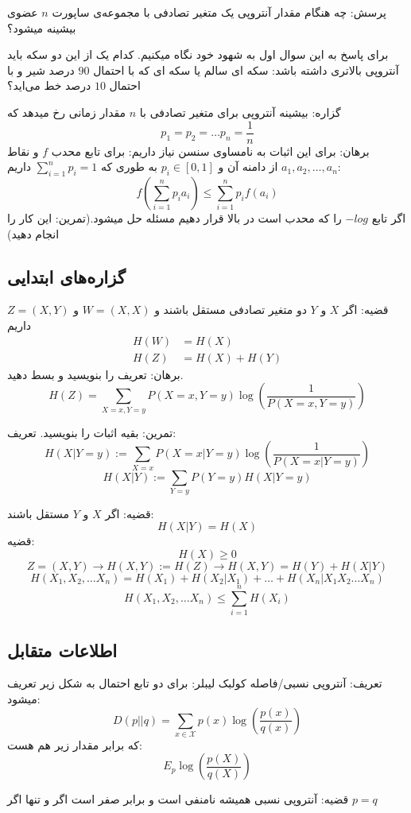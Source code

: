 پرسش: چه هنگام مقدار آنتروپی یک متغیر تصادفی با مجموعه‌ی ساپورت
$n$
عضوی بیشینه میشود؟

برای پاسخ به این سوال اول به شهود خود نگاه میکنیم. کدام یک از این دو سکه باید آنتروپی بالاتری داشته باشد: سکه ای سالم یا سکه ای که با احتمال
$90$
درصد شیر و با احتمال
$10$
درصد خط می‌اید؟

گزاره: بیشینه آنتروپی برای متغیر تصادفی با
$n$
مقدار زمانی رخ میدهد که
$$p_1 = p_2 = \dots p_n = \frac{1}{n}$$
برهان: برای این اثبات به نامساوی سنسن نیاز داریم: برای تابع محدب
$f$
و نقاط
$a_1, a_2, \dots, a_n$
از دامنه آن و
$p_i \in [0, 1]$
به طوری که
$\sum_{i = 1}^{n} p_i = 1$
داریم:
$$f(\sum_{i = 1}^{n} p_i a_i) \leq \sum_{i = 1}^{n} p_i f(a_i)$$
اگر تابع
$- log$
را که محدب است در بالا قرار دهیم مسئله حل میشود.(تمرین: این کار را انجام دهید)

\subsection{گزاره‌های ابتدایی}

قضیه: اگر
$X$
و
$Y$
دو متغیر تصادفی مستقل باشند و
$W = (X, X)$
و
$Z = (X, Y)$
داریم
\begin{align*}
    H(W) &= H(X) \\
    H(Z) &= H(X) + H(Y)
\end{align*}
برهان: تعریف را بنویسید و بسط دهید.
$$H(Z) = \sum_{X = x, Y = y} P(X = x, Y = y) \log(\frac{1}{ P(X = x, Y = y)})$$

تمرین: بقیه اثبات را بنویسید.
تعریف:
$$H(X | Y = y) := \sum_{X = x} P(X = x| Y = y) \log(\frac{1}{P(X = x| Y = y)})$$
$$H(X|Y) := \sum_{Y = y} P(Y = y) H(X | Y = y)$$

قضیه: اگر
$X$
و
$Y$
مستقل باشند:
$$H(X|Y) = H(X)$$
قضیه:
$$H(X) \geq 0$$
$$Z = (X, Y) \rightarrow H(X, Y) := H(Z) \rightarrow H(X, Y) = H(Y) + H(X|Y) $$
$$H(X_1, X_2, \dots X_n) = H(X_1) + H(X_2 | X_1) + \dots + H(X_n | X_1 X_2 \dots X_n)$$
$$H(X_1, X_2, \dots X_n) \leq \sum_{i = 1}^{n} H(X_i)$$

\subsection{اطلاعات متقابل}
تعریف: آنتروپی نسبی/فاصله کولبک لیبلر: برای دو تابع احتمال به شکل زیر تعریف میشود:
$$
D(p||q) = \sum_{x \in \mathcal{X}} p(x) \log(\dfrac{p(x)}{q(x)})
$$
که برابر مقدار زیر هم هست:
$$E_p \log(\dfrac{p(X)}{q(X)})$$

قضیه: آنتروپی نسبی همیشه نامنفی است و برابر صفر است اگر و تنها اگر
$p = q$

